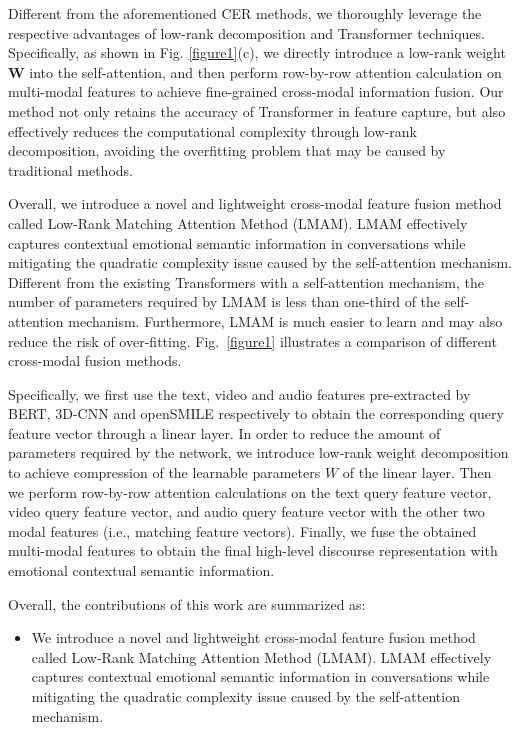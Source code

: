 {{{Different from the aforementioned CER methods, we thoroughly leverage the respective advantages of low-rank decomposition and Transformer techniques. Specifically, as shown in Fig. \ref{figure1}(c), we directly introduce a low-rank weight $\boldsymbol{W}$ into the self-attention, and then perform row-by-row attention calculation on multi-modal features to achieve fine-grained cross-modal information fusion. Our method not only retains the accuracy of Transformer in feature capture, but also effectively reduces the computational complexity through low-rank decomposition, avoiding the overfitting problem that may be caused by traditional methods.} 

{Overall, we introduce a novel and lightweight cross-modal feature fusion method called Low-Rank Matching Attention Method (LMAM). LMAM effectively captures contextual emotional semantic information in conversations while mitigating the quadratic complexity issue caused by the self-attention mechanism. Different from the existing Transformers with a self-attention mechanism, the number of parameters required by LMAM is less than one-third of the self-attention mechanism. Furthermore, LMAM is much easier to learn and may also reduce the risk of over-fitting. Fig.~\ref{figure1} illustrates a comparison of different cross-modal fusion methods. }

{Specifically, we first use the text, video and audio features pre-extracted by BERT, 3D-CNN and openSMILE respectively to obtain the corresponding query feature vector through a linear layer. In order to reduce the amount of parameters required by the network, we introduce low-rank weight decomposition to achieve compression of the learnable parameters $W$ of the linear layer. Then we perform row-by-row attention calculations on the text query feature vector, video query feature vector, and audio query feature vector with the other two modal features (i.e., matching feature vectors). Finally, we fuse the obtained multi-modal features to obtain the final high-level discourse representation with emotional contextual semantic information.}

Overall, the contributions of this work are summarized as:

\begin{itemize}
	\item We introduce a novel and lightweight cross-modal feature fusion method called Low-Rank Matching Attention Method (LMAM). LMAM effectively captures contextual emotional semantic information in conversations while mitigating the quadratic complexity issue caused by the self-attention mechanism.
	

\end{itemize}}}
